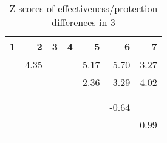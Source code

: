 \begin{table}[ht]
\centering
\begin{tabular}{rrrrrrr}
  \hline
1 & 2 & 3 & 4 & 5 & 6 & 7 \\ 
  \hline
 & 4.35 &  &  & 5.17 & 5.70 & 3.27 \\ 
   &  &  &  & 2.36 & 3.29 & 4.02 \\ 
   &  &  &  &  &  &  \\ 
   &  &  &  &  &  &  \\ 
   &  &  &  &  & -0.64 &  \\ 
   &  &  &  &  &  & 0.99 \\ 
   &  &  &  &  &  &  \\ 
   \hline
\end{tabular}
\caption{Z-scores of effectiveness/protection differences in  3} 
\end{table}
